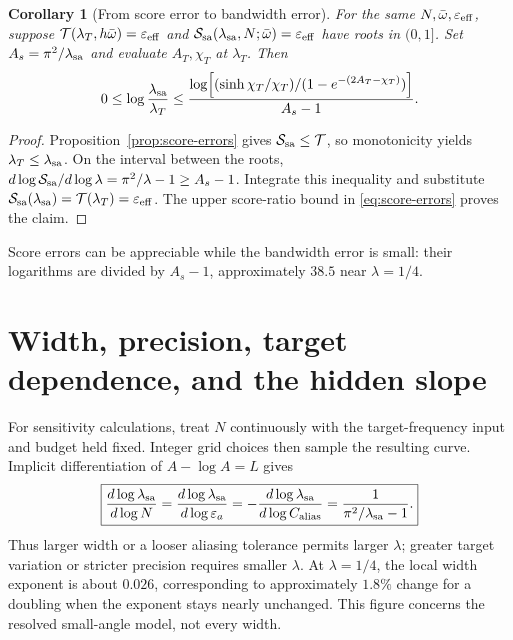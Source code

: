 \documentclass[11pt]{article}
\newtheorem{corollary}[theorem]{Corollary}
\theoremstyle{definition}\newtheorem{definition}[theorem]{Definition}
\theoremstyle{remark}\newtheorem{remark}[theorem]{Remark}
\numberwithin{equation}{section}
\newcommand{\T}{\mathcal T}
\newcommand{\Sa}{\mathcal S_{\rm sa}}
\begin{document}
\begin{corollary}[From score error to bandwidth error]
\label{cor:root-error}
For the same $N,\bar\omega,\varepsilon_{\rm eff}$, suppose
$\T(\lambda_T,h\bar\omega)=\varepsilon_{\rm eff}$ and
$\Sa(\lambda_{\rm sa},N;\bar\omega)=\varepsilon_{\rm eff}$ have roots in $(0,1]$. Set $A_s=\pi^2/\lambda_{\rm sa}$ and evaluate $A_T,\chi_T$ at $\lambda_T$. Then
\begin{equation}
 0\le\log\frac{\lambda_{\rm sa}}{\lambda_T}
 \le\frac{\displaystyle\log\!\left[
 (\sinh\chi_T/\chi_T)/(1-e^{-(2A_T-\chi_T)})\right]}{A_s-1}.
 \label{eq:root-error}
\end{equation}
\end{corollary}
\begin{proof}
Proposition~\ref{prop:score-errors} gives $\Sa\le\T$, so monotonicity yields $\lambda_T\le\lambda_{\rm sa}$. On the interval between the roots,
$d\log\Sa/d\log\lambda=\pi^2/\lambda-1\ge A_s-1$.
Integrate this inequality and substitute
$\Sa(\lambda_{\rm sa})=\T(\lambda_T)=\varepsilon_{\rm eff}$.
The upper score-ratio bound in \eqref{eq:score-errors} proves the claim.
\end{proof}
Score errors can be appreciable while the bandwidth error is small: their logarithms are divided by $A_s-1$, approximately $38.5$ near $\lambda=1/4$.

\section{Width, precision, target dependence, and the hidden slope}
\label{sec:sensitivity}
For sensitivity calculations, treat $N$ continuously with the target-frequency input and budget held fixed. Integer grid choices then sample the resulting curve. Implicit differentiation of $A-\log A=L$ gives
\begin{equation}
 \boxed{
 \frac{d\log\lambda_{\rm sa}}{d\log N}
 =\frac{d\log\lambda_{\rm sa}}{d\log\varepsilon_a}
 =-\frac{d\log\lambda_{\rm sa}}{d\log C_{\rm alias}}
 =\frac1{\pi^2/\lambda_{\rm sa}-1}.}
 \label{eq:sa-sensitivity}
\end{equation}
Thus larger width or a looser aliasing tolerance permits larger $\lambda$; greater target variation or stricter precision requires smaller $\lambda$. At $\lambda=1/4$, the local width exponent is about $0.026$, corresponding to approximately $1.8\%$ change for a doubling when the exponent stays nearly unchanged. This figure concerns the resolved small-angle model, not every width.
\end{document}
